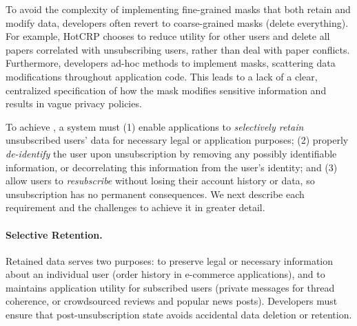 To avoid the complexity of implementing fine-grained masks that both retain and modify data, developers often revert to coarse-grained masks (\eg delete everything). For example, HotCRP chooses to reduce utility
for other users and delete all papers correlated with unsubscribing users, rather than deal with
paper conflicts.
%
Furthermore, developers ad-hoc methods to implement masks, scattering data modifications throughout
application code. This leads to a lack of a clear, centralized specification of how the mask modifies
sensitive information and results in \eg vague privacy policies.




\iffalse
To achieve \name, a system must (1) enable applications to \emph{selectively retain} unsubscribed
users' data for necessary legal or application purposes; (2) properly \emph{de-identify} the user
upon unsubscription by removing any possibly identifiable information, or decorrelating this
information from the user's identity; and (3) allow users to \emph{resubscribe} without losing their
account history or data, so unsubscription has no permanent consequences. We next describe each
requirement and the challenges to achieve it in greater detail.

\paragraph{Selective Retention.}
Retained data serves two purposes: to preserve legal or
necessary information about an individual user (\eg order history in e-commerce applications), and
to maintains application utility for subscribed users (\eg private messages
for thread coherence, or crowdsourced reviews and popular news posts).
Developers must ensure that post-unsubscription state avoids accidental data deletion or retention.

